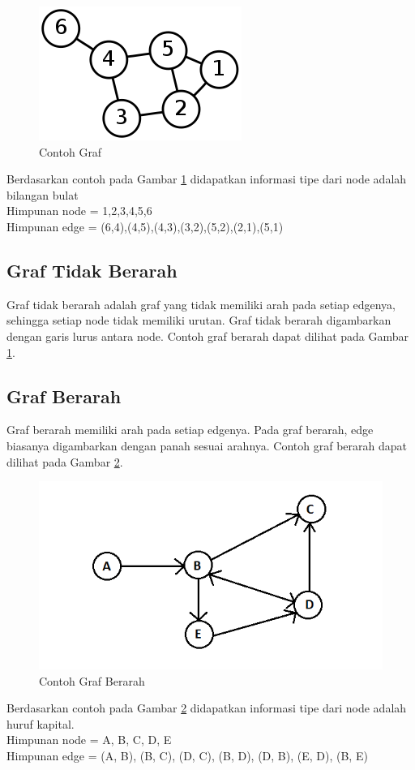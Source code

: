 \begin{figure}[h]
\centering
\includegraphics[scale=1]{Gambar/graph}
\caption[Contoh Graf]{Contoh Graf}
\label{fig:graph}
\end{figure}
Berdasarkan contoh pada Gambar \ref{fig:graph}  didapatkan informasi tipe dari
node adalah bilangan bulat \\
Himpunan node = {1,2,3,4,5,6} \\ 
Himpunan edge = {(6,4),(4,5),(4,3),(3,2),(5,2),(2,1),(5,1)}

\subsection{Graf Tidak Berarah}
Graf tidak berarah adalah graf yang tidak memiliki arah pada setiap edgenya,
sehingga setiap node tidak memiliki urutan. Graf tidak berarah digambarkan dengan garis lurus
antara node. Contoh graf berarah dapat dilihat pada Gambar
\ref{fig:graph}.

\subsection{Graf Berarah}
Graf berarah memiliki arah pada setiap edgenya. Pada graf berarah, edge biasanya
digambarkan dengan panah sesuai arahnya. Contoh graf berarah dapat dilihat pada
Gambar \ref{fig:direc_graph}.
\begin{figure}[h]
\centering
\includegraphics[scale=1]{Gambar/direc_graph}
\caption[Contoh Graf Berarah]{Contoh Graf Berarah}
\label{fig:direc_graph}
\end{figure}
Berdasarkan contoh pada Gambar \ref{fig:direc_graph}  didapatkan informasi tipe
dari node adalah huruf kapital. \\
Himpunan node = {A, B, C, D, E} \\ 
Himpunan edge = {(A, B), (B, C), (D, C), (B, D), (D, B), (E, D), (B, E)}

